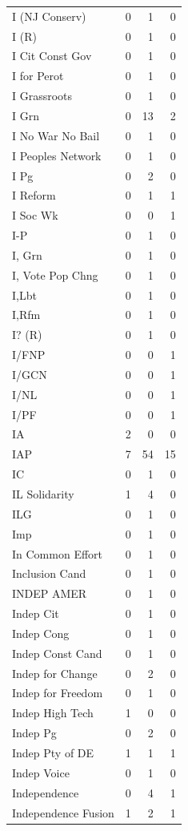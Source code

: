 \begin{supertabular}{lrrr}
I (NJ Conserv) & 0 & 1 & 0\\
I (R) & 0 & 1 & 0\\
I Cit Const Gov & 0 & 1 & 0\\
I for Perot & 0 & 1 & 0\\
I Grassroots & 0 & 1 & 0\\
I Grn & 0 & 13 & 2\\
I No War No Bail & 0 & 1 & 0\\
I Peoples Network & 0 & 1 & 0\\
I Pg & 0 & 2 & 0\\
I Reform & 0 & 1 & 1\\
I Soc Wk & 0 & 0 & 1\\
I-P & 0 & 1 & 0\\
I, Grn & 0 & 1 & 0\\
I, Vote Pop Chng & 0 & 1 & 0\\
I,Lbt & 0 & 1 & 0\\
I,Rfm & 0 & 1 & 0\\
I? (R) & 0 & 1 & 0\\
I/FNP & 0 & 0 & 1\\
I/GCN & 0 & 0 & 1\\
I/NL & 0 & 0 & 1\\
I/PF & 0 & 0 & 1\\
IA & 2 & 0 & 0\\
IAP & 7 & 54 & 15\\
IC & 0 & 1 & 0\\
IL Solidarity & 1 & 4 & 0\\
ILG & 0 & 1 & 0\\
Imp & 0 & 1 & 0\\
In Common Effort & 0 & 1 & 0\\
Inclusion Cand & 0 & 1 & 0\\
INDEP AMER & 0 & 1 & 0\\
Indep Cit & 0 & 1 & 0\\
Indep Cong & 0 & 1 & 0\\
Indep Const Cand & 0 & 1 & 0\\
Indep for Change & 0 & 2 & 0\\
Indep for Freedom & 0 & 1 & 0\\
Indep High Tech & 1 & 0 & 0\\
Indep Pg & 0 & 2 & 0\\
Indep Pty of DE & 1 & 1 & 1\\
Indep Voice & 0 & 1 & 0\\
Independence & 0 & 4 & 1\\
Independence Fusion & 1 & 2 & 1\\

\end{supertabular}

